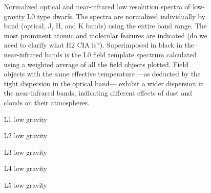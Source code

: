 \documentclass[12pt,preprint]{aastex}
\begin{document}

\begin{figure}
	\caption{Normalized optical and near-infrared low resolution spectra of low-gravity L0 type
dwarfs. The spectra are normalized individually by band (optical, J, H, and K bands)
using the entire band range. The most prominent atomic and molecular features are indicated
(do we need to clarify what H2 CIA is?). Superimposed in black in the near-infrared
bands is the L0 field template spectrum calculated using a weighted average of all the
field objects plotted. Field objects with the same effective temperature —as deducted by
the tight dispersion in the optical band— exhibit a wider dispersion in the
near-infrared bands, indicating different effects of dust and clouds on their
atmospheres.}
\label{fig:L0lg}
\end{figure}

\begin{figure}
	\caption{L1 low gravity}
	\label{fig:L1lg}
\end{figure}

\begin{figure}
	\caption{L2 low gravity}
	\label{fig:L2lg}
\end{figure}

\begin{figure}
	\caption{L3 low gravity}
	\label{fig:L3lg}
\end{figure}

\begin{figure}
	\caption{L4 low gravity}
	\label{fig:L4lg}
\end{figure}

\begin{figure}
	\caption{L5 low gravity}
	\label{fig:L5lg}
\end{figure}
\end{document}
